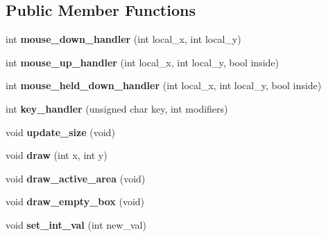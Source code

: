 \subsection*{Public Member Functions}
\begin{DoxyCompactItemize}
\item 
\hypertarget{classGLUI__Checkbox_a7cf605868f357f790890fb1eb01c4b5b}{int {\bfseries mouse\-\_\-down\-\_\-handler} (int local\-\_\-x, int local\-\_\-y)}\label{classGLUI__Checkbox_a7cf605868f357f790890fb1eb01c4b5b}

\item 
\hypertarget{classGLUI__Checkbox_a600720d43a3f7568c41cc23a34f7f601}{int {\bfseries mouse\-\_\-up\-\_\-handler} (int local\-\_\-x, int local\-\_\-y, bool inside)}\label{classGLUI__Checkbox_a600720d43a3f7568c41cc23a34f7f601}

\item 
\hypertarget{classGLUI__Checkbox_ad18f2ba9f3dc594db3f60c32bc9fe4d2}{int {\bfseries mouse\-\_\-held\-\_\-down\-\_\-handler} (int local\-\_\-x, int local\-\_\-y, bool inside)}\label{classGLUI__Checkbox_ad18f2ba9f3dc594db3f60c32bc9fe4d2}

\item 
\hypertarget{classGLUI__Checkbox_a246a4aea27d74689643eb4c1d5dc25ef}{int {\bfseries key\-\_\-handler} (unsigned char key, int modifiers)}\label{classGLUI__Checkbox_a246a4aea27d74689643eb4c1d5dc25ef}

\item 
\hypertarget{classGLUI__Checkbox_adce7c97553cc1b8b8200bf173efbffb1}{void {\bfseries update\-\_\-size} (void)}\label{classGLUI__Checkbox_adce7c97553cc1b8b8200bf173efbffb1}

\item 
\hypertarget{classGLUI__Checkbox_ad03530c711561d3d32348c8ee3f39b5a}{void {\bfseries draw} (int x, int y)}\label{classGLUI__Checkbox_ad03530c711561d3d32348c8ee3f39b5a}

\item 
\hypertarget{classGLUI__Checkbox_ae6b129ff35269a2510e3c38f627d82a3}{void {\bfseries draw\-\_\-active\-\_\-area} (void)}\label{classGLUI__Checkbox_ae6b129ff35269a2510e3c38f627d82a3}

\item 
\hypertarget{classGLUI__Checkbox_a477ff2ccc6f25ee1e3c8e16647af3e69}{void {\bfseries draw\-\_\-empty\-\_\-box} (void)}\label{classGLUI__Checkbox_a477ff2ccc6f25ee1e3c8e16647af3e69}

\item 
\hypertarget{classGLUI__Checkbox_a33a217485f0a8d17d7c45de5a91f57fd}{void {\bfseries set\-\_\-int\-\_\-val} (int new\-\_\-val)}\label{classGLUI__Checkbox_a33a217485f0a8d17d7c45de5a91f57fd}


\end{DoxyCompactItemize}
